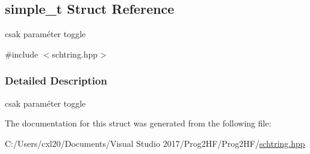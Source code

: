 \subsection{simple\+\_\+t Struct Reference}
\label{structsimple__t}


csak paraméter toggle  




{\ttfamily \#include $<$schtring.\+hpp$>$}



\subsubsection{Detailed Description}
csak paraméter toggle 

The documentation for this struct was generated from the following file\+:\begin{DoxyCompactItemize}
\item 
C\+:/\+Users/cxl20/\+Documents/\+Visual Studio 2017/\+Prog2\+H\+F/\+Prog2\+H\+F/\mbox{\hyperlink{schtring_8hpp}{schtring.\+hpp}}\end{DoxyCompactItemize}
